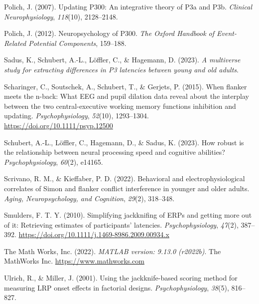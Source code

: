 \documentclass[
  man]{apa7}
\newlength{\cslhangindent}
\newlength{\cslentryspacingunit} %
\newenvironment{CSLReferences}[2] %
 {%
  \setlength{\parindent}{0pt}
  \ifodd #1
  \let\oldpar\par
  \def\par{\hangindent=\cslhangindent\oldpar}
  \fi
  \setlength{\parskip}{#2\cslentryspacingunit}
 }%
 {}
\begin{document}
\begin{CSLReferences}{1}{0}
\leavevmode{}%
Polich, J. (2007). Updating {P300}: An integrative theory of {P3a} and {P3b}. \emph{Clinical Neurophysiology}, \emph{118}(10), 2128--2148.

\leavevmode{}%
Polich, J. (2012). Neuropsychology of {P300}. \emph{The Oxford Handbook of Event-Related Potential Components}, 159--188.

\leavevmode{}%
Sadus, K., Schubert, A.-L., Löffler, C., \& Hagemann, D. (2023). \emph{A multiverse study for extracting differences in {P3} latencies between young and old adults}.

\leavevmode{}%
Scharinger, C., Soutschek, A., Schubert, T., \& Gerjets, P. (2015). When flanker meets the n-back: {What} {EEG} and pupil dilation data reveal about the interplay between the two central-executive working memory functions inhibition and updating. \emph{Psychophysiology}, \emph{52}(10), 1293--1304. \url{https://doi.org/10.1111/psyp.12500}

\leavevmode{}%
Schubert, A.-L., Löffler, C., Hagemann, D., \& Sadus, K. (2023). How robust is the relationship between neural processing speed and cognitive abilities? \emph{Psychophysiology}, \emph{60}(2), e14165.

\leavevmode{}%
Scrivano, R. M., \& Kieffaber, P. D. (2022). Behavioral and electrophysiological correlates of {Simon} and flanker conflict interference in younger and older adults. \emph{Aging, Neuropsychology, and Cognition}, \emph{29}(2), 318--348.

\leavevmode{}%
Smulders, F. T. Y. (2010). Simplifying jackknifing of {ERPs} and getting more out of it: {Retrieving} estimates of participants' latencies. \emph{Psychophysiology}, \emph{47}(2), 387--392. \url{https://doi.org/10.1111/j.1469-8986.2009.00934.x}

\leavevmode{}%
The Math Works, Inc. (2022). \emph{{MATLAB} version: 9.13.0 (r2022b)}. The MathWorks Inc. \url{https://www.mathworks.com}

\leavevmode{}%
Ulrich, R., \& Miller, J. (2001). Using the jackknife-based scoring method for measuring {LRP} onset effects in factorial designs. \emph{Psychophysiology}, \emph{38}(5), 816--827.


\end{CSLReferences}
\end{document}
